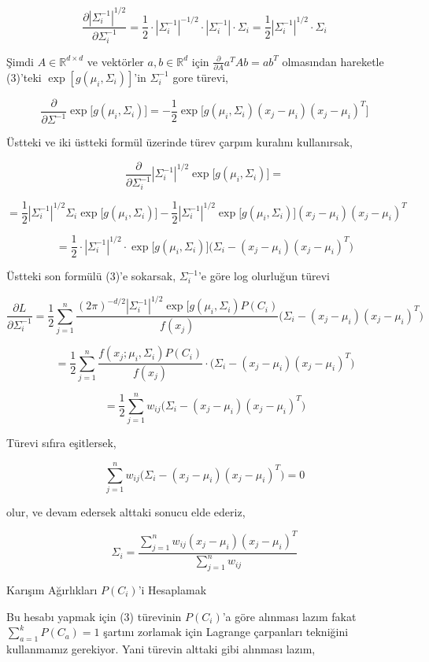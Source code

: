 \documentclass[12pt,fleqn]{article}\usepackage{../../common}
\begin{document}
$$ 
\frac{\partial |\Sigma_i^{-1}|^{1/2}}{\partial \Sigma_i^{-1}} = 
\frac{1}{2} \cdot |\Sigma_i^{-1}|^{-1/2} \cdot |\Sigma_i^{-1}| \cdot \Sigma_i  = 
\frac{1}{2} |\Sigma_i^{-1}|^{1/2} \cdot \Sigma_i
$$

Şimdi $A \in \mathbb{R}^{d \times d}$ ve vektörler $a,b \in \mathbb{R}^d$
için $\frac{\partial }{\partial A}a^TAb = ab^T$ olmasından hareketle
(3)'teki $\exp [g(\mu_i,\Sigma_i)]$'in $\Sigma_i^{-1}$ gore türevi,

$$ 
\frac{\partial }{\partial \Sigma^{-1}} \exp\big[ g(\mu_i,\Sigma_i)\big] = 
-\frac{1}{2} \exp \big[  g(\mu_i,\Sigma_i) (x_j-\mu_i)(x_j-\mu_i)^T \big]
$$

Üstteki ve iki üstteki formül üzerinde türev çarpım kuralını kullanırsak, 

$$ 
\frac{\partial }{\partial \Sigma_i^{-1}} |\Sigma_i^{-1}|^{1/2} 
\exp\big[ g(\mu_i,\Sigma_i) \big] =
$$

$$ 
= \frac{1}{2} |\Sigma_i^{-1}|^{1/2}  \Sigma_i \exp\big[ g(\mu_i,\Sigma_i) \big]-
\frac{1}{2} |\Sigma_i^{-1}|^{1/2} \exp\big[ g(\mu_i,\Sigma_i) \big]
(x_j-\mu_i)(x_j-\mu_i)^T
$$

$$ 
= \frac{1}{2} \cdot  |\Sigma_i^{-1}|^{1/2} \cdot 
\exp\big[ g(\mu_i,\Sigma_i) \big] \big( 
\Sigma_i - (x_j-\mu_i)(x_j-\mu_i)^T
\big)
$$

Üstteki son formülü (3)'e sokarsak, $\Sigma_i^{-1}$'e göre log olurluğun
türevi

$$ 
\frac{\partial L}{\partial \Sigma_i^{-1}} =
\frac{1}{2} \sum _{j=1}^{n} \frac
{(2\pi)^{-d/2} |\Sigma_i^{-1}|^{1/2}\exp\big[ g(\mu_i,\Sigma_i) P(C_i) }{f(x_j)}
\big( \Sigma_i - (x_j-\mu_i)(x_j-\mu_i)^T \big)
$$


$$ =
\frac{1}{2} \sum _{j=1}^{n} \frac{f(x_j;\mu_i,\Sigma_i) P(C_i)}{f(x_j)} \cdot
\big( \Sigma_i - (x_j-\mu_i)(x_j-\mu_i)^T \big)
$$

$$ 
= \frac{1}{2} \sum _{j=1}^{n} w_{ij} 
\big( \Sigma_i - (x_j-\mu_i)(x_j-\mu_i)^T \big)
$$

Türevi sıfıra eşitlersek,

$$ \sum _{j=1}^{n} w_{ij} \big( \Sigma_i - (x_j-\mu_i)(x_j-\mu_i)^T \big) = 0 $$

olur, ve devam edersek alttaki sonucu elde ederiz,

$$ 
\Sigma_i = \frac{\sum _{j=1}^{n} w_{ij} (x_j-\mu_i)(x_j-\mu_i)^T}
{\sum _{j=1}^{n} w_{ij}}
$$

Karışım Ağırlıkları $P(C_i)$'i Hesaplamak

Bu hesabı yapmak için (3) türevinin $P(C_i)$'a göre alınması lazım fakat 
$\sum _{a=1}^{k}P(C_a)=1$ şartını zorlamak için Lagrange çarpanları
tekniğini kullanmamız gerekiyor. Yani türevin alttaki gibi alınması lazım,
\end{document}
